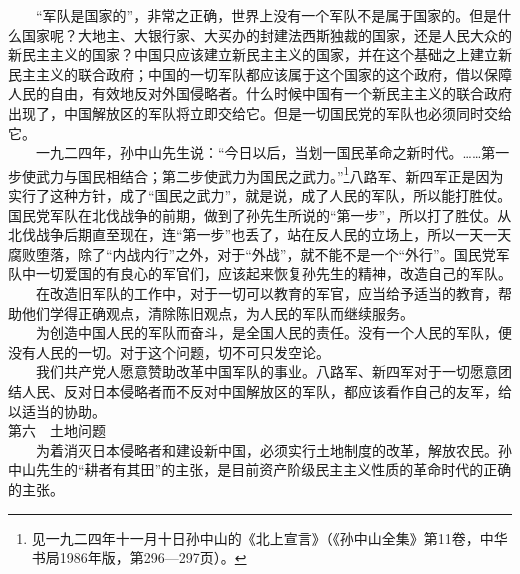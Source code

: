 \documentclass[cn,11pt,chinese]{elegantbook}
\begin{document}
　　“军队是国家的”，非常之正确，世界上没有一个军队不是属于国家的。但是什么国家呢？大地主、大银行家、大买办的封建法西斯独裁的国家，还是人民大众的新民主主义的国家？中国只应该建立新民主主义的国家，并在这个基础之上建立新民主主义的联合政府；中国的一切军队都应该属于这个国家的这个政府，借以保障人民的自由，有效地反对外国侵略者。什么时候中国有一个新民主主义的联合政府出现了，中国解放区的军队将立即交给它。但是一切国民党的军队也必须同时交给它。\\
　　一九二四年，孙中山先生说：“今日以后，当划一国民革命之新时代。……第一步使武力与国民相结合；第二步使武力为国民之武力。”\footnote[20]{  见一九二四年十一月十日孙中山的《北上宣言》（《孙中山全集》第11卷，中华书局1986年版，第296—297页）。}八路军、新四军正是因为实行了这种方针，成了“国民之武力”，就是说，成了人民的军队，所以能打胜仗。国民党军队在北伐战争的前期，做到了孙先生所说的“第一步”，所以打了胜仗。从北伐战争后期直至现在，连“第一步”也丢了，站在反人民的立场上，所以一天一天腐败堕落，除了“内战内行”之外，对于“外战”，就不能不是一个“外行”。国民党军队中一切爱国的有良心的军官们，应该起来恢复孙先生的精神，改造自己的军队。\\
　　在改造旧军队的工作中，对于一切可以教育的军官，应当给予适当的教育，帮助他们学得正确观点，清除陈旧观点，为人民的军队而继续服务。\\
　　为创造中国人民的军队而奋斗，是全国人民的责任。没有一个人民的军队，便没有人民的一切。对于这个问题，切不可只发空论。\\
　　我们共产党人愿意赞助改革中国军队的事业。八路军、新四军对于一切愿意团结人民、反对日本侵略者而不反对中国解放区的军队，都应该看作自己的友军，给以适当的协助。\\
第六　土地问题\\
　　为着消灭日本侵略者和建设新中国，必须实行土地制度的改革，解放农民。孙中山先生的“耕者有其田”的主张，是目前资产阶级民主主义性质的革命时代的正确的主张。\\
\end{document}
